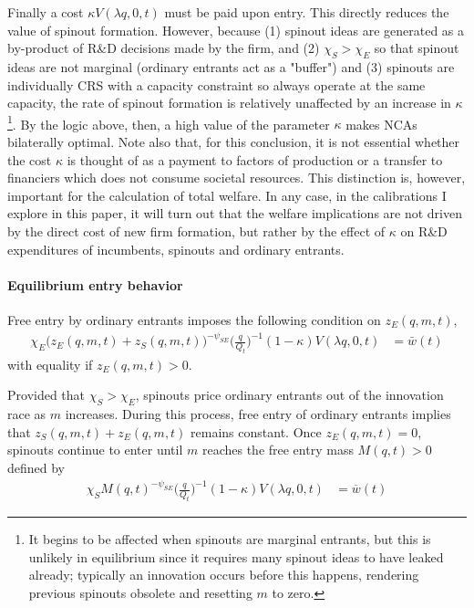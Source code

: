 \documentclass[12pt,english]{article}
\theoremstyle{remark}
\begin{document}
Finally a cost $\kappa V(\lambda q, 0, t)$ must be paid upon entry. This directly reduces the value of spinout formation. However, because (1) spinout ideas are generated as a by-product of R\&D decisions made by the firm, and (2) $\chi_S > \chi_E$ so that spinout ideas are not marginal (ordinary entrants act as a "buffer") and (3) spinouts are individually CRS with a capacity constraint so always operate at the same capacity, the rate of spinout formation is relatively unaffected by an increase in $\kappa$\footnote{It begins to be affected when spinouts are marginal entrants, but this is unlikely in equilibrium since it requires many spinout ideas to have leaked already; typically an innovation occurs before this happens, rendering previous spinouts obsolete and resetting $m$ to zero.}. By the logic above, then, a high value of the parameter $\kappa$ makes NCAs bilaterally optimal. Note also that, for this conclusion, it is not essential whether the cost $\kappa$ is thought of as a payment to factors of production or a transfer to financiers which does not consume societal resources. This distinction is, however, important for the calculation of total welfare. In any case, in the calibrations I explore in this paper, it will turn out that the welfare implications are not driven by the direct cost of new firm formation, but rather by the effect of $\kappa$ on R\&D expenditures of incumbents, spinouts and ordinary entrants. 

\paragraph{Equilibrium entry behavior}

Free entry by ordinary entrants imposes the following condition on $z_E(q,m,t)$, 
\begin{align}
\chi_E \big( z_E(q,m,t) + z_S(q,m,t) \big)^{-\psi_{SE}} \Big(\frac{q}{Q_t}\Big)^{-1}  (1-\kappa) V(\lambda q,0,t)  &= \bar{w}(t)\label{free_entry_entrants}
\end{align}
with equality if $z_E(q,m,t) > 0$. 

Provided that $\chi_S > \chi_E$, spinouts price ordinary entrants out of the innovation race as $m$ increases. During this process, free entry of ordinary entrants implies that $z_S(q,m,t) + z_E(q,m,t)$ remains constant. Once $z_E(q,m,t) = 0$, spinouts continue to enter until $m$ reaches the free entry mass $M(q,t) > 0$ defined by
\begin{align}
\chi_S  M(q,t)^{-\psi_{SE}}\Big(\frac{q}{Q_t}\Big)^{-1} (1-\kappa) V(\lambda q,0,t)  &= \overline{w}(t) \label{free_entry_spinouts}
\end{align}
\end{document}
